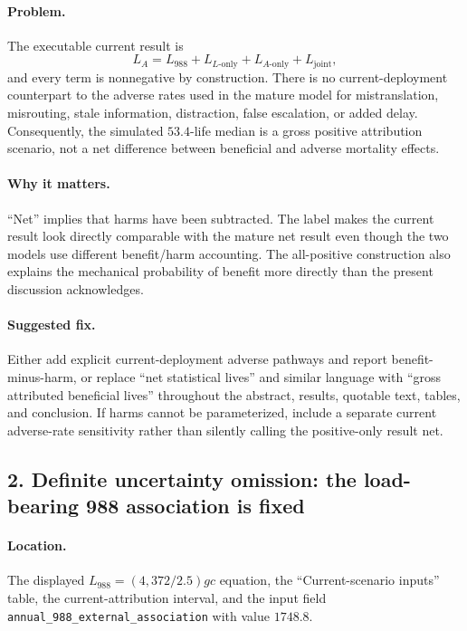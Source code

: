 \documentclass[11pt]{article}
\begin{document}
\paragraph{Problem.}
The executable current result is
\[
L_A=L_{988}+L_{L\text{-only}}+L_{A\text{-only}}+L_{\mathrm{joint}},
\]
and every term is nonnegative by construction.  There is no current-deployment
counterpart to the adverse rates used in the mature model for mistranslation,
misrouting, stale information, distraction, false escalation, or added delay.
Consequently, the simulated $53.4$-life median is a gross positive attribution
scenario, not a net difference between beneficial and adverse mortality
effects.

\paragraph{Why it matters.}
``Net'' implies that harms have been subtracted.  The label makes the current
result look directly comparable with the mature net result even though the two
models use different benefit/harm accounting.  The all-positive construction
also explains the mechanical probability of benefit more directly than the
present discussion acknowledges.

\paragraph{Suggested fix.}
Either add explicit current-deployment adverse pathways and report
benefit-minus-harm, or replace ``net statistical lives'' and similar language
with ``gross attributed beneficial lives'' throughout the abstract, results,
quotable text, tables, and conclusion.  If harms cannot be parameterized,
include a separate current adverse-rate sensitivity rather than silently
calling the positive-only result net.

\subsection*{2. Definite uncertainty omission: the load-bearing 988 association is fixed}

\paragraph{Location.}
The displayed $L_{988}=(4{,}372/2.5)gc$ equation, the ``Current-scenario
inputs'' table, the current-attribution interval, and the input field
\texttt{annual\_988\_external\_association} with value $1748.8$.
\end{document}

